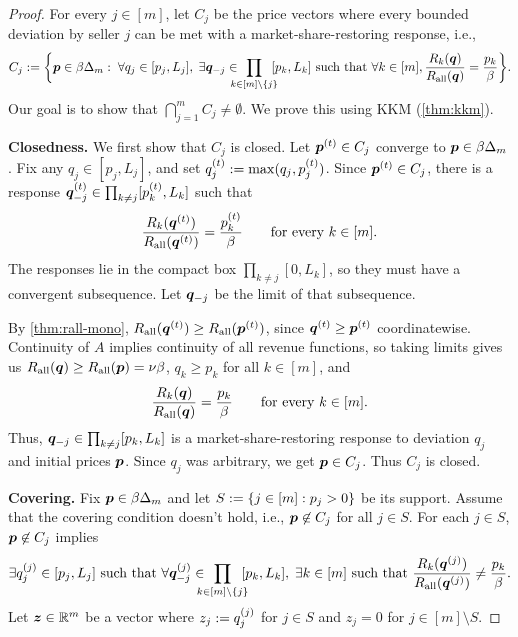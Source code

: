 \begin{proof}
For every $j \in [m]$, let $C_j$ be the price vectors where every bounded deviation by seller $j$
can be met with a market-share-restoring response, i.e.,
\[ C_j \defeq \bigg\{\pvec \in \beta\Delta_m:\; \forall q_j \in [p_j, L_j],\;
    \exists \qvec_{-j} \in \!\!\!\!\!\prod_{k \in [m] \setminus \{j\}} \!\!\! [p_k, L_k] \text{ such that }
    \forall k \in [m], \frac{R_k(\qvec)}{R_{\all}(\qvec)} = \frac{p_k}{\beta} \bigg\}. \]
Our goal is to show that $\bigcap_{j=1}^m C_j \neq \emptyset$.
We prove this using KKM (\cref{thm:kkm}).

\textbf{Closedness.}
We first show that $C_j$ is closed. Let $\bm{p}^{(t)} \in C_j$ converge to $\bm{p} \in \beta\Delta_m$.
Fix any $q_j \in [p_j, L_j]$, and set $q_j^{(t)} := \max(q_j, p_j^{(t)})$.
Since $\bm{p}^{(t)} \in C_j$, there is a response
$\bm{q}_{-j}^{(t)} \in \prod_{k \ne j} [p_k^{(t)}, L_k]$ such that
\[ \frac{R_k(\bm{q}^{(t)})}{R_{\operatorname{all}}(\bm{q}^{(t)})}
    = \frac{p_k^{(t)}}{\beta} \qquad \text{for every } k \in [m]. \]
The responses lie in the compact box $\prod_{k \ne j} [0, L_k]$,
so they must have a convergent subsequence.
Let $\bm{q}_{-j}$ be the limit of that subsequence.

By \cref{thm:rall-mono}, $R_{\operatorname{all}}(\bm{q}^{(t)}) \ge R_{\operatorname{all}}(\bm{p}^{(t)})$,
since $\bm{q}^{(t)} \ge \bm{p}^{(t)}$ coordinatewise.
Continuity of $A$ implies continuity of all revenue functions,
so taking limits gives us $R_{\operatorname{all}}(\bm{q}) \ge R_{\operatorname{all}}(\bm{p}) = \nu\beta$,
$q_k \ge p_k$ for all $k \in [m]$, and
\[ \frac{R_k(\bm{q})}{R_{\operatorname{all}}(\bm{q})} = \frac{p_k}{\beta}
    \qquad \text{for every }k \in [m]. \]
Thus, $\bm{q}_{-j} \in \prod_{k \neq j} [p_k, L_k]$ is a market-share-restoring response
to deviation $q_j$ and initial prices $\bm{p}$.
Since $q_j$ was arbitrary, we get $\bm{p} \in C_j$. Thus $C_j$ is closed.

\textbf{Covering.}
Fix $\bm{p} \in \beta\Delta_m$ and let $S := \{j \in [m]: p_j > 0\}$ be its support.
Assume that the covering condition doesn't hold, i.e., $\bm{p} \not\in C_j$ for all $j \in S$.
For each $j \in S$, $\bm{p} \not\in C_j$ implies
\[ \exists q^{(j)}_j \in [p_j, L_j] \text{ such that }
    \forall \qvec^{(j)}_{-j} \in \!\!\!\!\!\prod_{k \in [m] \setminus \{j\}} \!\!\! [p_k, L_k],\;
    \exists k \in [m] \text{ such that } \frac{R_k(\qvec^{(j)})}{R_{\all}(\qvec^{(j)})} \neq \frac{p_k}{\beta}. \]
Let $\bm{z} \in \mathbb{R}^m$ be a vector where $z_j := q^{(j)}_j$ for $j \in S$
and $z_j = 0$ for $j \in [m] \setminus S$.


\end{proof}
